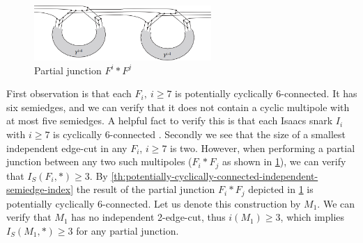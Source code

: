 \documentclass[12pt, twoside]{book}
\begin{document}
\begin{example}
	\begin{figure}
		\centering
		\includegraphics[width=0.6\textwidth]{images/Gi-first-partial-junction}
		\caption{Partial junction $F^i*F^j$}
		\label{fig:Gi-first-partial-junction}
	\end{figure}

	First observation is that each $F_i,~i\geq 7$ is potentially cyclically 6-connected. It has six semiedges, and we can verify that it does not contain a cyclic multipole with at most five semiedges. A helpful fact to verify this is that each Isaacs snark $I_i$ with $i\geq 7$ is cyclically 6-connected \cite{Mazak2022}. Secondly we see that the size of a smallest independent edge-cut in any $F_i$, $i\geq 7$ is two. However, when performing a partial junction between any two such multipoles ($F_i*F_j$ as shown in \cref{fig:Gi-first-partial-junction}), we can verify that $I_S(F_i,*)\geq 3$. By \cref{th:potentially-cyclically-connected-independent-semiedge-index} the result of the partial junction $F_i*F_j$ depicted in \cref{fig:Gi-first-partial-junction}  is potentially cyclically 6-connected. Let us denote this construction by $M_1$. We can verify that $M_1$ has no independent 2-edge-cut, thus $i(M_1)\geq 3$, which implies $I_S(M_1, *)\geq 3$ for any partial junction.
		

\end{example}
\end{document}
